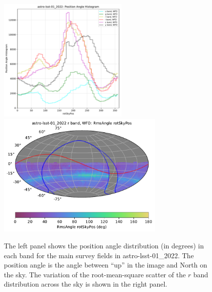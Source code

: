 \documentclass[DM,lsstdraft,authoryear,toc]{lsstdoc}
\begin{document}
\begin{figure}[htb]
\centering
\vskip -0.0in
\includegraphics[height=2.4in]{figures/astro-lsst-01_2022-rotpos_hist_per_filter.pdf}
\includegraphics[height=2.4in]{figures/astro-lsst-01_2022_RmsAngle_rotSkyPos_r_band_WFD_OPSI_SkyMap.pdf}
\vskip -0.1in
\caption{The left panel shows the position angle distribution (in degrees) in each band for the
main survey fields in astro-lsst-01\_2022. The position angle is the angle between
``up'' in the image and North on the sky. The variation of the root-mean-square scatter of the
$r$ band distribution across the sky is shown in the right panel.}
\label{fig:baseline_rotator}
\end{figure}
\end{document}
